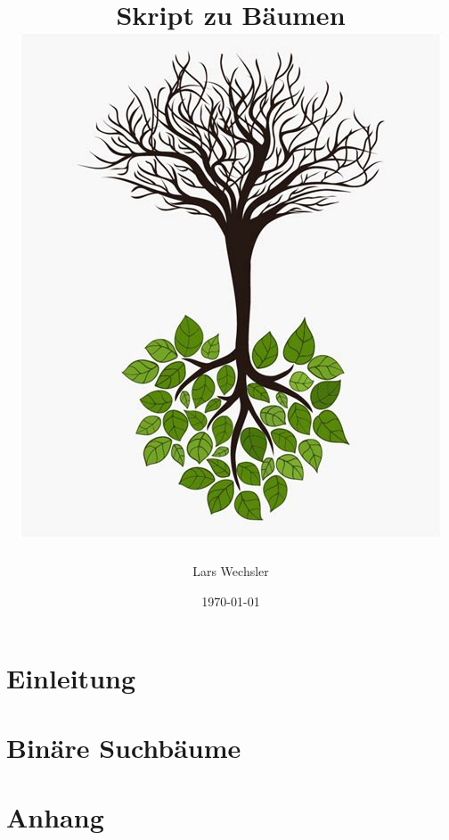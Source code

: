 \documentclass{article}
\author{Lars Wechsler}
\title{Skript zu Bäumen \\ \centering\includegraphics[scale=0.80]{../media/tree.jpg}}
\date{\today}
\begin{document}
\maketitle
\newpage
\tableofcontents
\newpage 

\section{Einleitung}



\newpage
\section{Binäre Suchbäume}




%

\newpage
\section{Anhang}


\end{document}
